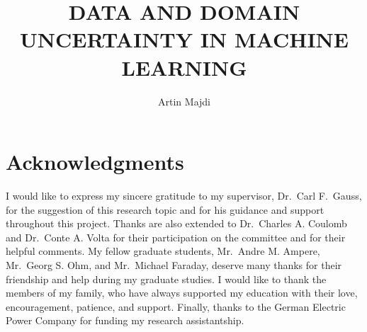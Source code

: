 \author{Artin Majdi}
\title{DATA AND DOMAIN UNCERTAINTY IN MACHINE LEARNING}


\fancyhf{}
\cfoot{\thepage}
\chead{\th}

\maketitle%

\chapter*{Acknowledgments}
I would like to express my sincere gratitude to my supervisor,
Dr.\ Carl F.\ Gauss, for the suggestion of this research topic and for his
guidance and support throughout this project.
Thanks are also extended to Dr.\ Charles A. Coulomb and Dr.\ Conte A. Volta
for their participation on the committee and for their helpful comments.
My fellow graduate students, Mr.\ Andre M. Ampere, Mr.\ Georg S. Ohm, and
Mr.\ Michael Faraday, deserve many thanks for their friendship and help during
my graduate studies.
I would like to thank the members of my family, who have always supported my
education with their love, encouragement, patience, and support.
Finally, thanks to the German Electric Power Company for funding my research
assistantship.

%
\tableofcontents
\listoffigures
\newpage
\listoftables
\newpage

